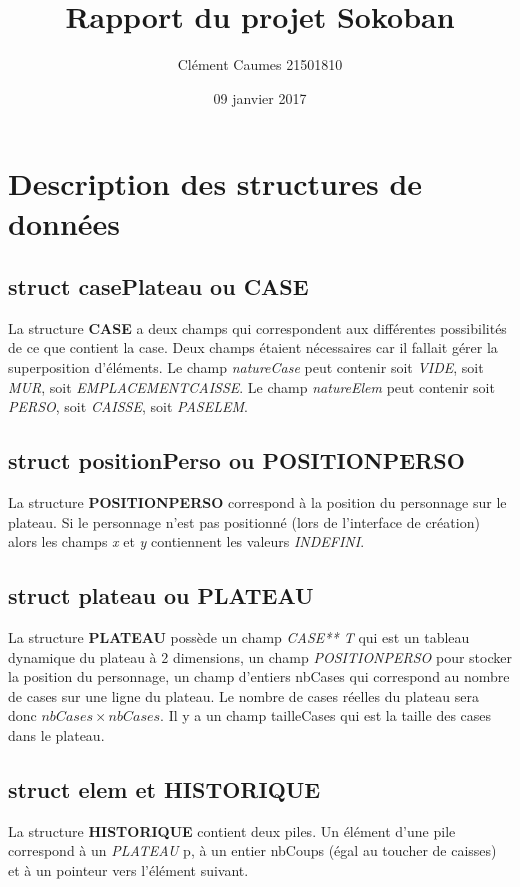 \documentclass[a4]{article}
\author{Clément Caumes 21501810}
\title{Rapport du projet Sokoban}
\date{09 janvier 2017}
\begin{document}
\maketitle

\section{Description des structures de données}
\subsection{struct casePlateau ou CASE}
La structure \textbf{CASE} a deux champs qui correspondent aux différentes possibilités de ce que contient la case.
Deux champs étaient nécessaires car il fallait gérer la superposition d'éléments.
Le champ \textit{natureCase} peut contenir soit \emph{VIDE}, soit \emph{MUR}, soit \emph{EMPLACEMENT\textunderscore CAISSE}.
Le champ \textit{natureElem} peut contenir soit \emph{PERSO}, soit \emph{CAISSE}, soit \emph{PAS\textunderscore ELEM}.

\subsection{struct positionPerso ou POSITIONPERSO}
La structure \textbf{POSITIONPERSO} correspond à la position du personnage sur le plateau. 
Si le personnage n'est pas positionné (lors de l'interface de création) alors les champs \textit{x} et \textit{y} contiennent les valeurs \emph{INDEFINI}.

\subsection{struct plateau ou PLATEAU}
La structure \textbf{PLATEAU} possède un champ \textit{CASE** T} qui est un tableau dynamique du plateau à 2 dimensions, 
un champ \textit{POSITIONPERSO} pour stocker la position du personnage, un champ d'entiers nbCases qui correspond au nombre de cases sur une ligne du plateau.
Le nombre de cases réelles du plateau sera donc $nbCases \times nbCases$. Il y a un champ tailleCases qui est la taille des cases dans le plateau. 

\subsection{struct elem et HISTORIQUE}
La structure \textbf{HISTORIQUE} contient deux piles. Un élément d'une pile correspond à un \textit{PLATEAU} p, à
un entier nbCoups (égal au toucher de caisses) et à un pointeur vers l'élément suivant.
\end{document}
